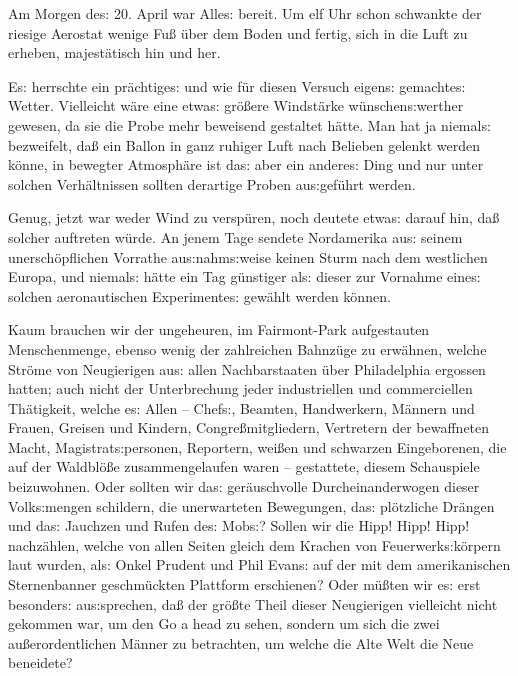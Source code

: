 \documentclass[oneside,12pt]{book}
\newenvironment{antiqua}{\normalfont}{}
\newcommand{\s}{s:}
\begin{document}
Am Morgen de{\s} 20. April war Alle{\s} bereit. Um elf Uhr schon
schwankte der riesige Aerostat wenige Fu{\ss} \"uber dem Boden und
fertig, sich in die Luft zu erheben, majest\"atisch hin und her.

E{\s} herrschte ein pr\"achtige{\s} und wie f\"ur diesen Versuch
eigen{\s} gemachte{\s} Wetter. Vielleicht w\"are eine etwa{\s}
gr\"o{\ss}ere Windst\"arke w\"unschen{\s}werther gewesen, da sie die
Probe mehr beweisend gestaltet h\"atte. Man hat ja niemal{\s}
bezweifelt, da{\ss} ein Ballon in ganz ruhiger Luft nach Belieben
gelenkt werden k\"onne, in bewegter Atmosph\"are ist da{\s} aber ein
andere{\s} Ding und nur unter solchen Verh\"altnissen sollten
derartige Proben au{\s}gef\"uhrt werden.

Genug, jetzt war weder Wind zu versp\"uren, noch deutete etwa{\s}
darauf hin, da{\ss} solcher auftreten w\"urde. An jenem Tage sendete
Nordamerika au{\s} seinem unersch\"opflichen Vorrathe
au{\s}nahm{\s}weise keinen Sturm nach dem westlichen Europa, und
niemal{\s} h\"atte ein Tag g\"unstiger al{\s} dieser zur Vornahme
eine{\s} solchen aeronautischen Experimente{\s} gew\"ahlt werden
k\"onnen.

Kaum brauchen wir der ungeheuren, im Fairmont-Park aufgestauten
Menschenmenge, ebenso wenig der zahlreichen Bahnz\"uge zu erw\"ahnen,
welche Str\"ome von Neugierigen au{\s} allen Nachbarstaaten \"uber
Philadelphia ergossen hatten; auch nicht der Unterbrechung jeder
industriellen und commerciellen Th\"atigkeit, welche e{\s} Allen --
Chef{\s}, Beamten, Handwerkern, M\"annern und Frauen, Greisen und
Kindern, Congre{\ss}mitgliedern, Vertretern der bewaffneten Macht,
Magistrat{\s}personen, Reportern, wei{\ss}en und schwarzen
Eingeborenen, die auf der Waldbl\"o{\ss}e zusammengelaufen waren --
gestattete, diesem Schauspiele beizuwohnen. Oder sollten wir da{\s}
ger\"auschvolle Durcheinanderwogen dieser Volk{\s}mengen schildern,
die unerwarteten Bewegungen, da{\s} pl\"otzliche Dr\"angen und da{\s}
Jauchzen und Rufen de{\s} Mob{\s}? Sollen wir die Hipp! Hipp! Hipp!
nachz\"ahlen, welche von allen Seiten gleich dem Krachen von
Feuerwerk{\s}k\"orpern laut wurden, al{\s} Onkel Prudent und Phil
Evan{\s} auf der mit dem amerikanischen Sternenbanner geschm\"uckten
Plattform erschienen? Oder m\"u{\ss}ten wir e{\s} erst besonder{\s}
au{\s}sprechen, da{\ss} der gr\"o{\ss}te Theil dieser Neugierigen
vielleicht nicht gekommen war, um den \begin{antiqua}Go a
head\end{antiqua} zu sehen, sondern um sich die zwei
au{\ss}erordentlichen M\"anner zu betrachten, um welche die Alte Welt
die Neue beneidete?
\end{document}
